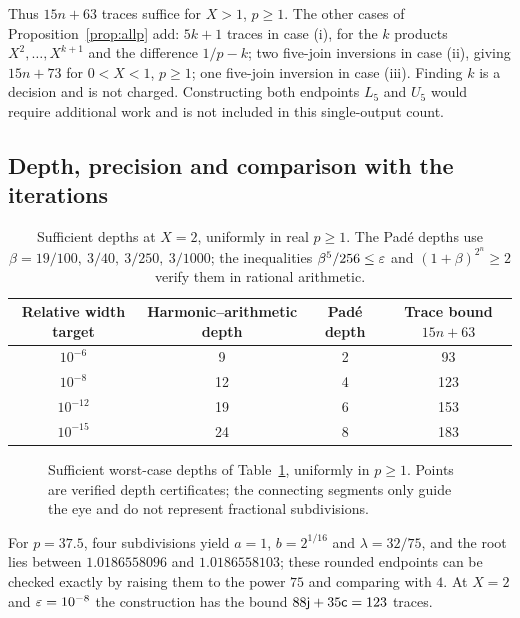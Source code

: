 Thus $15n+63$ traces suffice for $X>1$, $p\ge1$. The other cases of Proposition~\ref{prop:allp} add:
$5k+1$ traces in case (i), for the $k$ products $X^{2},\dots,X^{k+1}$ and the difference $1/p-k$;
two five-join inversions in case (ii), giving $15n+73$ for $0<X<1$, $p\ge1$; one five-join
inversion in case (iii). Finding $k$ is a decision and is not charged. Constructing both endpoints
$L_5$ and $U_5$ would require additional work and is not included in this single-output count.

\subsection{Depth, precision and comparison with the iterations}

\begin{table}[htbp]
\centering\small
\caption{Sufficient depths at $X=2$, uniformly in real $p\ge1$. The Pad\'e depths use
$\beta=19/100,\ 3/40,\ 3/250,\ 3/1000$; the inequalities $\beta^{5}/256\le\varepsilon$ and
$(1+\beta)^{2^{n}}\ge2$ verify them in rational arithmetic.}\label{tab:depth}
\begin{tabular}{@{}cccc@{}}
\toprule
Relative width target & Harmonic--arithmetic depth & Pad\'e depth & Trace bound $15n+63$\\
\midrule
$10^{-6}$ & 9 & 2 & 93\\
$10^{-8}$ & 12 & 4 & 123\\
$10^{-12}$ & 19 & 6 & 153\\
$10^{-15}$ & 24 & 8 & 183\\
\bottomrule
\end{tabular}
\end{table}

\begin{figure}[htbp]
\centering\figDepth
\caption{Sufficient worst-case depths of Table~\ref{tab:depth}, uniformly in $p\ge1$. Points are
verified depth certificates; the connecting segments only guide the eye and do not represent fractional
subdivisions.}\label{fig:depth}
\end{figure}

For $p=37.5$, four subdivisions yield $a=1$, $b=2^{1/16}$ and $\lambda=32/75$, and the root lies between
$1.0186558096$ and $1.0186558103$; these rounded endpoints can be checked exactly by raising them to the
power $75$ and comparing with $4$. At $X=2$ and $\varepsilon=10^{-8}$ the construction has the bound
$88\mathsf{j}+35\mathsf{c}=123$ traces.

